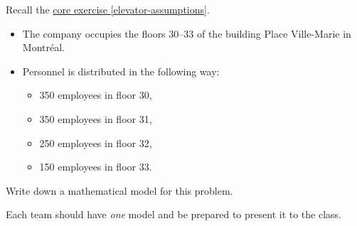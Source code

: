 


\begin{minipage}{.5\textwidth}	
\question \label{model:preclass}
Recall the \hyperref[elevator-assumptions]{core exercise \ref{elevator-assumptions}}.

\begin{itemize}
	\item The company occupies the floors 30--33 of the building Place Ville-Marie in Montr\'eal.

	\item Personnel is distributed in the following way: 
	\begin{itemize}
		\item 350 employees in floor 30,
		\item 350 employees in floor 31,
		\item 250 employees in floor 32, 
		\item 150 employees in floor 33.
	\end{itemize}
\end{itemize}


Write down a mathematical model for this problem.
\label{elevator-model}

\begin{teamwork}
Each team should have \emph{one} model and be prepared to present it to the class.	
\end{teamwork}

\end{minipage}
\qquad
\begin{minipage}{.5\textwidth}	
\email
\end{minipage}

